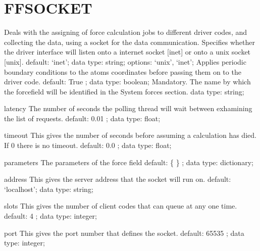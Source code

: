 \section{FFSOCKET}
\label{FFSOCKET}
\begin{ipifield}{}%
{Deals with the assigning of force calculation jobs to different driver codes, and collecting the data, using a socket for the data communication.}%
{}%
{%
{Specifies whether the driver interface will listen onto a internet socket [inet] or onto a unix socket [unix].}%
{default: `inet'; data type: string; options: `unix', `inet'; }%
%
{Applies periodic boundary conditions to the atoms coordinates before passing them on to the driver code.}%
{default:  True ; data type: boolean; }%
%
{Mandatory. The name by which the forcefield will be identified in the System forces section.}%
{data type: string; }%
}
\begin{ipifield}{latency}%
{The number of seconds the polling thread will wait between exhamining the list of requests.}%
{default:  0.01 ; data type: float; }%
{}
\end{ipifield}
\begin{ipifield}{timeout}%
{This gives the number of seconds before assuming a calculation has died. If 0 there is no timeout.}%
{default:  0.0 ; data type: float; }%
{}
\end{ipifield}
\begin{ipifield}{parameters}%
{The parameters of the force field}%
{default:  \{ \} ; data type: dictionary; }%
{}
\end{ipifield}
\begin{ipifield}{address}%
{This gives the server address that the socket will run on.}%
{default: `localhost'; data type: string; }%
{}
\end{ipifield}
\begin{ipifield}{slots}%
{This gives the number of client codes that can queue at any one time.}%
{default:  4 ; data type: integer; }%
{}
\end{ipifield}
\begin{ipifield}{port}%
{This gives the port number that defines the socket.}%
{default:  65535 ; data type: integer; }%
{}
\end{ipifield}
\end{ipifield}
